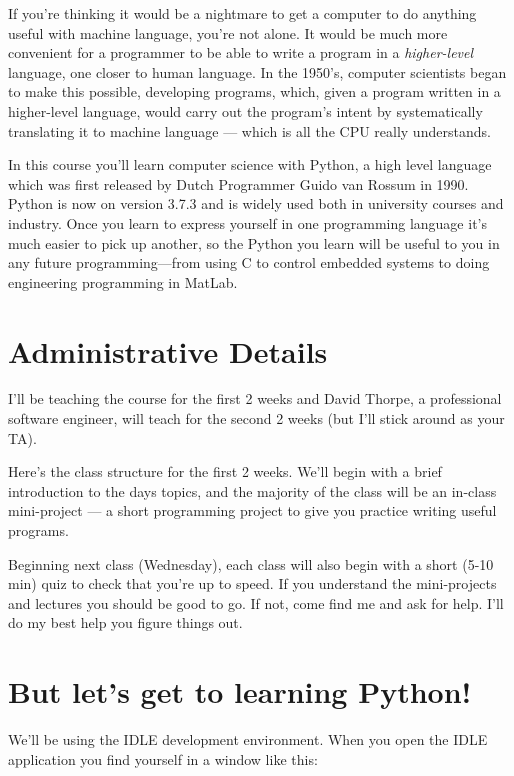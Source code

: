 If you’re thinking it would be a nightmare to get a computer to do anything useful with machine language, you’re not alone. It would be much more convenient for a programmer to be able to write a program in a \emph{higher-level} language, one closer to human language. In the 1950’s, computer scientists began to make this possible, developing programs, which, given a program written in a higher-level language, would carry out the program’s intent by systematically translating it to machine language --- which is all the CPU really understands. 

In this course you’ll learn computer science with Python, a high level language which was first released by Dutch Programmer Guido van Rossum in 1990. Python is now on version 3.7.3 and is widely used both in university courses and industry. Once you learn to express yourself in one programming language it’s much easier to pick up another, so the Python you learn will be useful to you in any future programming—from using C to control embedded systems to doing engineering programming in MatLab.


\section*{Administrative Details}

I’ll be teaching the course for the first 2 weeks and David Thorpe, a professional software engineer, will teach for the second 2 weeks (but I’ll stick around as your TA). 

Here’s the class structure for the first 2 weeks. We’ll begin with a brief introduction to the days topics, and the majority of the class will be an in-class mini-project --- a short programming project to give you practice writing useful programs. 

Beginning next class (Wednesday), each class will also begin with a short (5-10 min) quiz to check that you’re up to speed. If you understand the mini-projects and lectures you should be good to go. If not, come find me and ask for help. I’ll do my best help you figure things out.


\section*{But let’s get to learning Python!}

We’ll be using the IDLE development environment. When you open the IDLE application you find yourself in a window like this:

